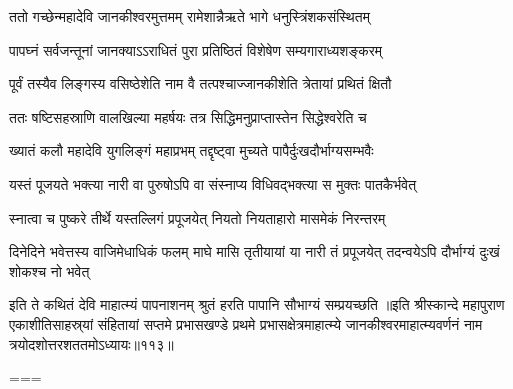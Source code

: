 \vakta{}
\shrota{}
\tags{}
\notes{}

\storymeta





\twolineshloka
{ततो गच्छेन्महादेवि जानकीश्वरमुत्तमम्}
{रामेशान्नैऋते भागे धनुस्त्रिंशकसंस्थितम्}%

\twolineshloka
{पापघ्नं सर्वजन्तूनां जानक्याऽऽराधितं पुरा}
{प्रतिष्ठितं विशेषेण सम्यगाराध्यशङ्करम्}%

\twolineshloka
{पूर्वं तस्यैव लिङ्गस्य वसिष्ठेशेति नाम वै}
{तत्पश्चाज्जानकीशेति त्रेतायां प्रथितं क्षितौ}%

\twolineshloka
{ततः षष्टिसहस्राणि वालखिल्या महर्षयः}
{तत्र सिद्धिमनुप्राप्तास्तेन सिद्धेश्वरेति च}%

\twolineshloka
{ख्यातं कलौ महादेवि युगलिङ्गं महाप्रभम्}
{तद्दृष्ट्वा मुच्यते पापैर्दुःखदौर्भाग्यसम्भवैः}%

\twolineshloka
{यस्तं पूजयते भक्त्या नारी वा पुरुषोऽपि वा}
{संस्नाप्य विधिवद्भक्त्या स मुक्तः पातकैर्भवेत्}%

\twolineshloka
{स्नात्वा च पुष्करे तीर्थे यस्तल्लिगं प्रपूजयेत्}
{नियतो नियताहारो मासमेकं निरन्तरम्}%

\threelineshloka
{दिनेदिने भवेत्तस्य वाजिमेधाधिकं फलम्}
{माघे मासि तृतीयायां या नारी तं प्रपूजयेत्}
{तदन्वयेऽपि दौर्भाग्यं दुःखं शोकश्च नो भवेत्}%

\twolineshloka
{इति ते कथितं देवि माहात्म्यं पापनाशनम्}
{श्रुतं हरति पापानि सौभाग्यं सम्प्रयच्छति}%
॥इति श्रीस्कान्दे महापुराण एकाशीतिसाहस्र्यां संहितायां सप्तमे प्रभासखण्डे प्रथमे प्रभासक्षेत्रमाहात्म्ये जानकीश्वरमाहात्म्यवर्णनं नाम त्रयोदशोत्तरशततमोऽध्यायः॥११३॥

===


\vakta{}
\shrota{}
\tags{}
\notes{}

\storymeta




